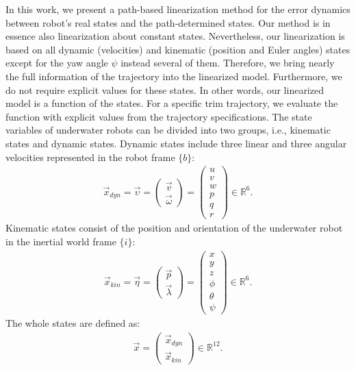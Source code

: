 In this  work, we present a path-based linearization method for the error dynamics between robot's real states and the path-determined states. Our method is in essence also linearization about constant states. Nevertheless, our linearization is based on all dynamic (velocities) and kinematic (position and Euler angles) states except for the yaw angle $\psi$ instead several of them. Therefore, we bring nearly the full information of the trajectory into the linearized model. Furthermore, we do not require explicit values for these states. In other words, our linearized model is a function of the states. For a specific trim trajectory, we evaluate the function with explicit values from the trajectory specifications. The state variables of underwater robots can be divided into two groups, i.e., kinematic states and dynamic states. Dynamic states include three linear and three angular velocities represented in the robot frame $\lbrace b \rbrace$:
\begin{align}
\vec{x}_{dyn}=\vec{\upsilon}=
\begin{pmatrix}
\vec{v}\\ \vec{\omega}
\end{pmatrix}=
\begin{pmatrix}
u\\v\\w\\p\\q\\r
\end{pmatrix}
\in 
\mathbb{R}^{6}.
\end{align}
Kinematic states consist of the position and orientation of the underwater robot in the inertial world frame $\lbrace i \rbrace$:
\begin{align}
\vec{x}_{kin}=\vec{\eta}=
\begin{pmatrix}
\vec{p} \\ \vec{\lambda}
\end{pmatrix}=
\begin{pmatrix}
x \\ y \\ z \\ \phi \\ \theta\\ \psi
\end{pmatrix}
\in 
\mathbb{R}^{6}.
\end{align}
The whole states are defined as:
\begin{align}
\vec{x}=
\begin{pmatrix}
\vec{x}_{dyn}\\ \vec{x}_{kin}
\end{pmatrix}
\in 
\mathbb{R}^{12}.
\end{align}
